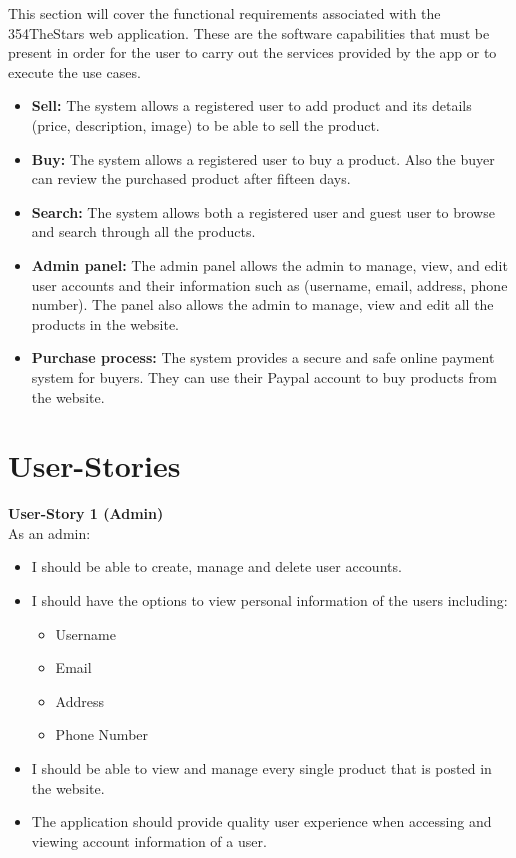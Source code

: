 \documentclass[11pt]{article}
\newcounter{use case ID}
\newcounter{req ID}
\begin{document}
This section will cover the functional requirements associated with the 354TheStars web application. These are the software capabilities that must be present in order for the user to carry out the services provided by the app or to execute the use cases.

\begin{itemize}
    \item \textbf{Sell:} The system allows a registered user to add product and its details (price, description, image) to be able to sell the product.
    \item \textbf{Buy:} The system allows a registered user to buy a product. Also the buyer can review the purchased product after fifteen days.
    \item  \textbf{Search:} The system allows both a registered user and guest user to browse and search through all the products.
    \item  \textbf{Admin panel:} The admin panel allows the admin to manage, view, and edit user accounts and their information such as (username, email, address, phone number). The panel also allows the admin to manage, view and edit all the products in the website.
    \item \textbf{Purchase process:} The system provides a secure and safe online payment system for buyers. They can use their Paypal account to buy products from the website.
\end{itemize}

\clearpage

\section{User-Stories}

\textbf{User-Story 1 (Admin)} \\
As an admin:
\begin{itemize}
   \item I should be able to create, manage and delete user accounts.
    \item I should have the options to view personal information of the users including:
        \begin{itemize}
            \item Username
            \item Email
            \item Address
            \item Phone Number
        \end{itemize}
    \item I should be able to view and manage every single product that is posted in the website.
    \item The application should provide quality user experience when accessing and viewing account information of a user.
\end{itemize}
\end{document}
